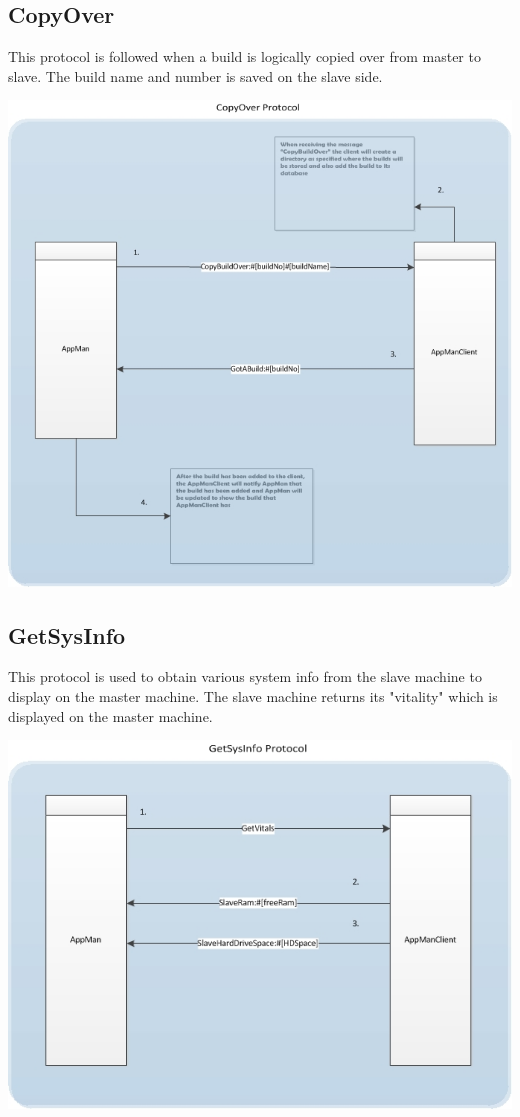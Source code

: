\documentclass[a4paper,12pt,final]{article}
\begin{document}
\subsection{CopyOver}
This protocol is followed when a build is logically copied over from master to slave. The build name and number is saved on the slave side. 
\begin{center}
\includegraphics[scale=0.85]{CommunicationProtocol/CopyOverProtocol.jpg} 
\end{center}

\subsection{GetSysInfo}
This protocol is used to obtain various system info from the slave machine to display on the master machine. The slave machine returns its "vitality" which is displayed on the master machine.
\begin{center}
\includegraphics[scale=0.85]{CommunicationProtocol/GetSysInfoProtocol.jpg} 
\end{center}
\end{document}
